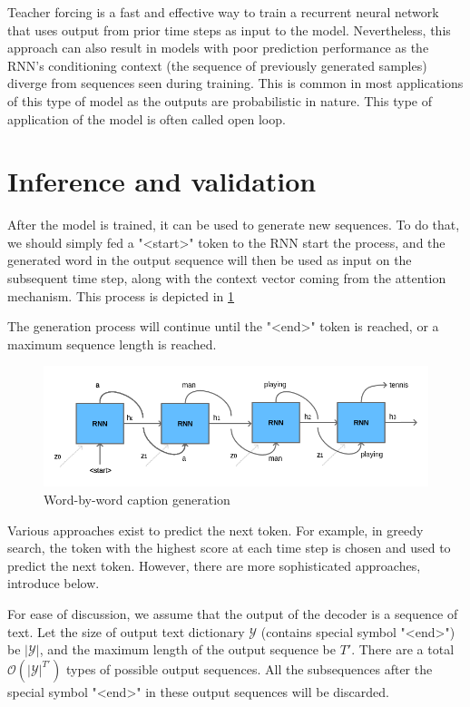 Teacher forcing is a fast and effective way to train a recurrent neural network that uses output from prior time steps as input to the model. Nevertheless, this approach can also result in models with poor prediction performance as the RNN’s conditioning context (the sequence of previously generated samples) diverge from sequences seen during training\citep{Lamb2016}. This is common in most applications of this type of model as the outputs are probabilistic in nature. This type of application of the model is often called open loop.

\section{Inference and validation}\label{sec:inference}

After the model is trained, it can be used to generate new sequences. To do that, we should simply fed a "<start>" token to the RNN start the process, and the generated word in the output sequence will then be used as input on the subsequent time step, along with the context vector coming from the attention mechanism. This process is depicted in \cref{fig:inference}

The generation process will continue until the "<end>" token is reached, or a maximum sequence length is reached. 

\begin{figure}[hpt]
	\centering
	\includegraphics[scale=0.5]{images/ch4/inference.png}
	\caption{Word-by-word caption generation}
	\label{fig:inference}
\end{figure}


Various approaches exist to predict the next token. For example, in greedy search, the token with the highest score at each time step is chosen and used to predict the next token. However, there are more sophisticated approaches, introduce below. 

For ease of discussion, we assume that the output of the decoder is a sequence of text. Let the size of output text dictionary $\mathcal{Y}$ (contains special symbol "<end>") be $\left|\mathcal{Y}\right|$, and the maximum length of the output sequence be $T'$. There are a total $\mathcal{O}(\left|\mathcal{Y}\right|^{T'})$ types of possible output sequences. All the subsequences after the special symbol "<end>" in these output sequences will be discarded.

